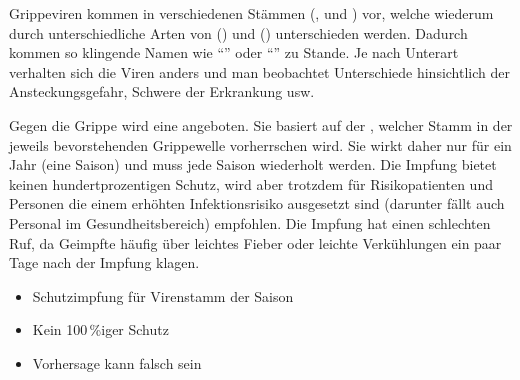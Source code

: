 {
Grippeviren kommen in verschiedenen
Stämmen (,  und ) vor, welche
wiederum durch unterschiedliche Arten von
 () und 
() unterschieden werden. Dadurch kommen so
klingende Namen wie \enquote{} oder
\enquote{} zu Stande. Je nach Unterart verhalten
sich die Viren anders und man beobachtet Unterschiede
hinsichtlich der Ansteckungsgefahr, Schwere der Erkrankung
usw.
\Z{}
}
{

}
{}
{}
{}

{%
Gegen die Grippe wird eine  angeboten. Sie
basiert auf der , welcher Stamm in der jeweils
bevorstehenden Grippewelle vorherrschen wird. Sie wirkt
daher nur für ein Jahr (eine Saison) und muss jede Saison
wiederholt werden. Die Impfung bietet keinen
hundertprozentigen Schutz, wird aber trotzdem für
Risikopatienten und Personen die einem erhöhten
Infektionsrisiko ausgesetzt sind (darunter fällt auch
Personal im Gesundheitsbereich) empfohlen. Die Impfung hat
einen schlechten Ruf, da Geimpfte häufig über leichtes
Fieber oder leichte Verkühlungen ein paar Tage nach der
Impfung klagen.
}{
\begin{itemize}
  \item Schutzimpfung für  Virenstamm der Saison
  \item Kein 100\,\%iger Schutz
  \item Vorhersage kann falsch sein
\end{itemize}
}
{}
{}
{}

\cite{Gallaher2009,H1N1InvTeam2009,Peiris2009,Wolf2009,Cutler2009}



